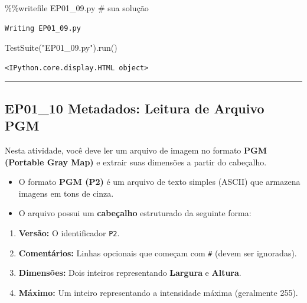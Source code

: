 \documentclass[
  portuguese,
  letterpaper,
  openany,
  oneside,
  12pt,
  a4paper]{book}
\newenvironment{Shaded}{\begin{snugshade}}{\end{snugshade}}
\newcommand{\CommentTok}[1]{\textcolor[rgb]{0.37,0.37,0.37}{#1}}
\newcommand{\NormalTok}[1]{\textcolor[rgb]{0.00,0.23,0.31}{#1}}
\newcommand{\OperatorTok}[1]{\textcolor[rgb]{0.37,0.37,0.37}{#1}}
\newcommand{\StringTok}[1]{\textcolor[rgb]{0.13,0.47,0.30}{#1}}
\providecommand{\tightlist}{%
  \setlength{\itemsep}{0pt}\setlength{\parskip}{0pt}}
\begin{document}
\begin{Shaded}
\begin{Highlighting}[]
\OperatorTok{\%\%}\NormalTok{writefile EP01\_09.py}
\CommentTok{\# sua solução}
\end{Highlighting}
\end{Shaded}

\begin{verbatim}
Writing EP01_09.py
\end{verbatim}

\begin{Shaded}
\begin{Highlighting}[]
\NormalTok{TestSuite(}\StringTok{"EP01\_09.py"}\NormalTok{).run()}
\end{Highlighting}
\end{Shaded}

\begin{verbatim}
<IPython.core.display.HTML object>
\end{verbatim}

\begin{center}\rule{0.5\linewidth}{0.5pt}\end{center}

\subsection{\texorpdfstring{EP01\_10  Metadados:
Leitura de Arquivo
PGM}{EP01\_10  Metadados: Leitura de Arquivo PGM}}\label{ep01_10-metadados-leitura-de-arquivo-pgm}

Nesta atividade, você deve ler um arquivo de imagem no formato
\textbf{PGM (Portable Gray Map)} e extrair suas dimensões a partir do
cabeçalho.

\begin{itemize}
\tightlist
\item
  O formato \textbf{PGM (P2)} é um arquivo de texto simples (ASCII) que
  armazena imagens em tons de cinza.
\item
  O arquivo possui um \textbf{cabeçalho} estruturado da seguinte forma:
\end{itemize}

\begin{enumerate}
\def\labelenumi{\arabic{enumi}.}
\tightlist
\item
  \textbf{Versão:} O identificador \texttt{P2}.
\item
  \textbf{Comentários:} Linhas opcionais que começam com \texttt{\#}
  (devem ser ignoradas).
\item
  \textbf{Dimensões:} Dois inteiros representando \textbf{Largura} e
  \textbf{Altura}.
\item
  \textbf{Máximo:} Um inteiro representando a intensidade máxima
  (geralmente 255).
\end{enumerate}
\end{document}
